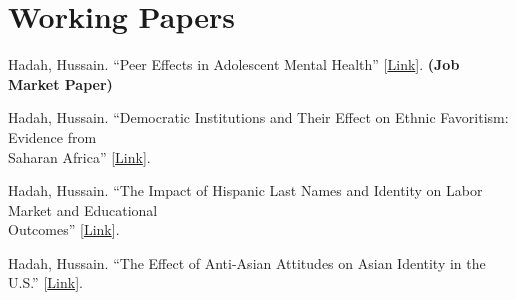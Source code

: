 \documentclass[letterpaper]{article}
\renewenvironment{itemize}{
  \begin{list}{}{
    \setlength{\leftmargin}{1.5em}
  }
}{
  \end{list}
}
\begin{document}
\section*{Working Papers}
\vspace{2 mm}
\begin{itemize}
  \item Hadah, Hussain. ``Peer Effects in Adolescent Mental Health'' [\href{https://hhadah.github.io/Depression_Idea/my_paper/Hadah-Peer-Effect-Depression.pdf}{Link}]. \textbf{(Job Market Paper)}
  \item Hadah, Hussain. ``Democratic Institutions and Their Effect on Ethnic Favoritism: Evidence from \\{\makebox[4mm]{\hfill}} Saharan Africa'' [\href{https://dx.doi.org/10.2139/ssrn.4566225}{Link}].
  \item Hadah, Hussain. ``The Impact of Hispanic Last Names and Identity on Labor Market and Educational \\{\makebox[4mm]{\hfill}} Outcomes'' [\href{https://dx.doi.org/10.2139/ssrn.4566234}{Link}]. 
  \item Hadah, Hussain. ``The Effect of Anti-Asian Attitudes on Asian Identity in the U.S.'' [\href{https://hhadah.github.io/asian-identity-attrition/my_paper/submit_preprint.pdf}{Link}]. 

\end{itemize}
\vspace{2 mm}
\end{document}
